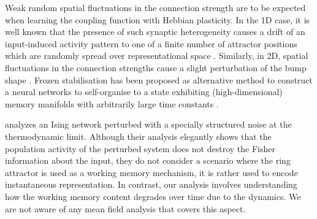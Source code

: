 \documentclass{article} %
\newcounter{ct}
\theoremstyle{definition}
\theoremstyle{remark}
\begin{document}
Weak random spatial fluctuations in the connection strength are to be expected when learning the coupling function with Hebbian plasticity.
In the 1D case, it is well known that the presence of such synaptic heterogeneity causes a drift of an input-induced activity pattern to one of a finite number of attractor positions which are randomly spread over representational space \citep{Renart2003,itskov2011short}.
Similarly, in 2D, spatial fluctuations in the connection strengths cause a slight perturbation of the bump shape \citep{wojtak2023robust}.
Frozen stabilisation has been proposed as alternative method to construct a neural networks to self-organise to a state exhibiting (high-dimensional) memory manifolds with arbitrarily large time constants \citep{can2021emergence}. %



\citep{kuhn2023information} analyzes an Ising network perturbed with a specially structured noise at the thermodynamic limit.
Although their analysis elegantly shows that the population activity of the perturbed system does not destroy the Fisher information about the input, they do not consider a scenario where the ring attractor is used as a working memory mechanism, it is rather used to encode instantaneous representation.
In contrast, our analysis involves understanding how the working memory content degrades over time due to the dynamics. We are not aware of any mean field analysis that covers this aspect.






\end{document}
